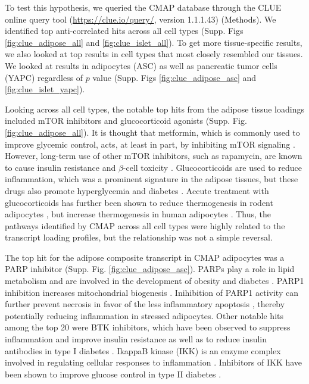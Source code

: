 \documentclass[
]{article}
\begin{document}
To test this hypothesis, we queried the CMAP database through the CLUE
online query tool (\url{https://clue.io/query/}, version 1.1.1.43)
(Methods). We identified top anti-correlated hits across all cell types
(Supp. Figs \ref{fig:clue_adipose_all} and \ref{fig:clue_islet_all}). To
get more tissue-specific results, we also looked at top results in cell
types that most closely resembled our tissues. We looked at results in
adipocytes (ASC) as well as pancreatic tumor cells (YAPC) regardless of
\(p\) value (Supp. Figs \ref{fig:clue_adipose_asc} and
\ref{fig:clue_islet_yapc}).

Looking across all cell types, the notable top hits from the adipose
tissue loadings included mTOR inhibitors and glucocorticoid agonists
(Supp. Fig. \ref{fig:clue_adipose_all}). It is thought that metformin,
which is commonly used to improve glycemic control, acts, at least in
part, by inhibiting mTOR signaling \cite{pmid30290005, 
pmid30034573}. However, long-term use of other mTOR inhibitors, such as
rapamycin, are known to cause insulin resistance and \(\beta\)-cell
toxicity \cite{pmid30034573, pmid23881200, pmid21266327}.
Glucocorticoids are used to reduce inflammation, which was a prominent
signature in the adipose tissues, but these drugs also promote
hyperglycemia and diabetes \cite{pmid24582093, pmid35585199}. Accute
treatment with glucocorticoids has further been shown to reduce
thermogenesis in rodent adipocytes \cite{pmid30310815, 
pmid11254472, pmid23197361}, but increase thermogenesis in human
adipocytes \cite{pmid27411014, pmid25385872}. Thus, the pathways
identified by CMAP across all cell types were highly related to the
transcript loading profiles, but the relationship was not a simple
reversal.

The top hit for the adipose composite transcript in CMAP adipocytes was
a PARP inhibitor (Supp. Fig. \ref{fig:clue_adipose_asc}). PARPs play a
role in lipid metabolism and are involved in the development of obesity
and diabetes \cite{pmid34450194}. PARP1 inhibition increases
mitochondrial biogenesis \cite{pmid21459330}. Inihibition of PARP1
activity can further prevent necrosis in favor of the less inflammatory
apoptosis \cite{pmid12114611}, thereby potentially reducing inflammation
in stressed adipocytes. Other notable hits among the top 20 were BTK
inhibitors, which have been observed to suppress inflammation and
improve insulin resistance \cite{pmid33648925} as well as to reduce
insulin antibodies in type I diabetes \cite{pmid28753229}. IkappaB
kinase (IKK) is an enzyme complex involved in regulating cellular
responses to inflammation \cite{pmid17047224}. Inhibitors of IKK have
been shown to improve glucose control in type II diabetes
\cite{pmid28683283, 
pmid15685170}.
\end{document}
